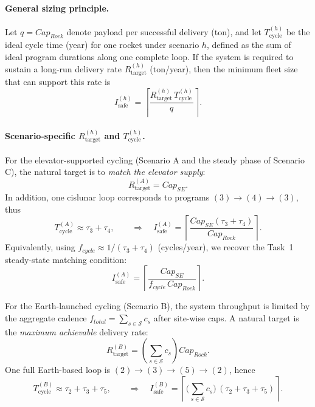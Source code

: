 ﻿\documentclass{mcmthesis}
\begin{document}
\paragraph{General sizing principle.}
Let $q=Cap_{Rock}$ denote payload per successful delivery (ton), and let
$T_{\text{cycle}}^{(h)}$ be the ideal cycle time (year) for one rocket under scenario $h$,
defined as the sum of ideal program durations along one complete loop.
If the system is required to sustain a long-run delivery rate $R_{\text{target}}^{(h)}$
(ton/year), then the minimum fleet size that can support this rate is
\begin{equation}
I_{\text{safe}}^{(h)}
=
\left\lceil
\frac{R_{\text{target}}^{(h)}\, T_{\text{cycle}}^{(h)}}{q}
\right\rceil .
\end{equation}

\paragraph{Scenario-specific $R_{\text{target}}^{(h)}$ and $T_{\text{cycle}}^{(h)}$.}
For the elevator-supported cycling (Scenario A and the steady phase of Scenario C),
the natural target is to \emph{match the elevator supply}:
\begin{equation}
R_{\text{target}}^{(A)} = Cap_{SE}.
\end{equation}
In addition, one cislunar loop corresponds to programs $(3)\rightarrow(4)\rightarrow(3)$,
thus
\begin{equation}
T_{\text{cycle}}^{(A)} \approx \tau_3+\tau_4,
\qquad
\Rightarrow\quad
I_{\text{safe}}^{(A)}
=
\left\lceil
\frac{Cap_{SE}(\tau_3+\tau_4)}{Cap_{Rock}}
\right\rceil .
\end{equation}
Equivalently, using $f_{cycle}\approx 1/(\tau_3+\tau_4)$ (cycles/year), we recover the Task~1
steady-state matching condition:
\begin{equation}
I_{\text{safe}}^{(A)}
=
\left\lceil
\frac{Cap_{SE}}{f_{cycle}\,Cap_{Rock}}
\right\rceil .
\end{equation}

For the Earth-launched cycling (Scenario B), the system throughput is limited by the
aggregate cadence $f_{total}=\sum_{s\in\mathcal{S}} c_s$ after site-wise caps. A natural target is the \emph{maximum achievable} delivery rate:
\begin{equation}
R_{\text{target}}^{(B)} = \left(\sum_{s\in\mathcal{S}} c_s\right) Cap_{Rock}.
\end{equation}
One full Earth-based loop is $(2)\rightarrow(3)\rightarrow(5)\rightarrow(2)$, hence
\begin{equation}
T_{\text{cycle}}^{(B)} \approx \tau_2+\tau_3+\tau_5,
\qquad
\Rightarrow\quad
I_{\text{safe}}^{(B)}
=
\left\lceil
\bigl(\sum_{s\in\mathcal{S}} c_s\bigr)\,(\tau_2+\tau_3+\tau_5)
\right\rceil .
\end{equation}
\end{document}
